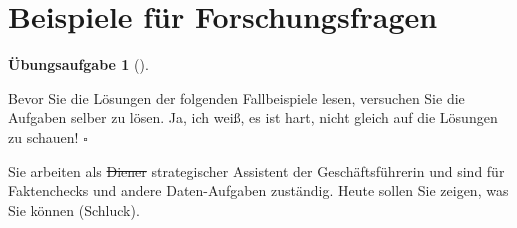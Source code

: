 \documentclass[
  letterpaper,
  oneside,
  open=any]{scrbook}
\theoremstyle{definition}
\newtheorem{exercise}{Übungsaufgabe}[chapter]
\theoremstyle{definition}
\theoremstyle{definition}
\theoremstyle{remark}
\begin{document}
\section{Beispiele für
Forschungsfragen}\label{beispiele-fuxfcr-forschungsfragen}

\begin{exercise}[]\protect\hypertarget{exr-fallbsps}{}\label{exr-fallbsps}

Bevor Sie die Lösungen der folgenden Fallbeispiele lesen, versuchen Sie
die Aufgaben selber zu lösen. Ja, ich weiß, es ist hart, nicht gleich
auf die Lösungen zu schauen! \(\square\)

\end{exercise}

Sie arbeiten als \st{Diener} strategischer Assistent der
Geschäftsführerin und sind für Faktenchecks und andere Daten-Aufgaben
zuständig. Heute sollen Sie zeigen, was Sie können (Schluck).
\end{document}
